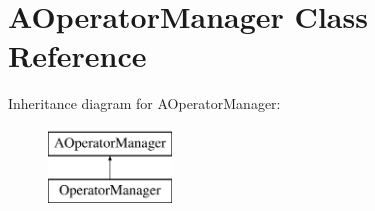 \hypertarget{classAOperatorManager}{\section{\-A\-Operator\-Manager \-Class \-Reference}
\label{classAOperatorManager}
}
\-Inheritance diagram for \-A\-Operator\-Manager\-:\begin{figure}[H]
\begin{center}
\leavevmode
\includegraphics[height=2.000000cm]{classAOperatorManager}
\end{center}
\end{figure}
